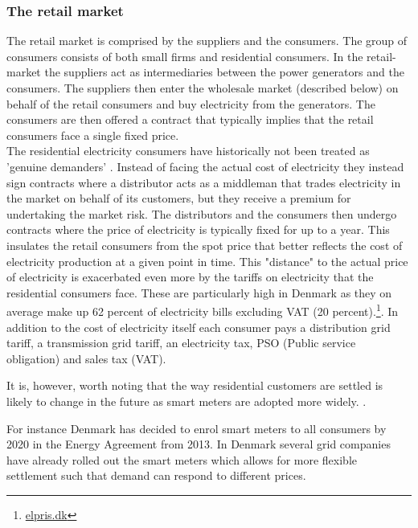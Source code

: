 \subsubsection{The retail market}
\label{subsubsec: t_resmarket}
The retail market is comprised by the suppliers and the consumers. The group of consumers consists of both small firms and residential consumers. In the retail-market the suppliers act as intermediaries between the power generators and the consumers. The suppliers then enter the wholesale market (described below) on behalf of the retail consumers and buy electricity from the generators. The consumers are then offered a contract that typically implies that the retail consumers face a single fixed price. %
\smallskip \\
The residential electricity consumers have historically not been treated as 'genuine demanders' \citep{kirschen2003demand}. Instead of facing the actual cost of electricity they instead sign contracts where a distributor acts as a middleman that trades electricity in the market on behalf of its customers, but they receive a premium for undertaking the market risk. The distributors and the consumers then undergo contracts where the price of electricity is typically fixed for up to a year. This insulates the retail consumers from the spot price that better reflects the cost of electricity production at a given point in time. This "distance" to the actual price of electricity is exacerbated even more by the tariffs on electricity that the residential consumers face. These are particularly high in Denmark as they on average make up 62 percent of electricity bills excluding VAT (20 percent).\footnote{\href{https://elpris.dk}{elpris.dk}}. In addition to the cost of electricity itself each consumer pays a distribution grid tariff, a transmission grid tariff, an electricity tax, PSO (Public service obligation) and sales tax (VAT).
\medskip

It is, however, worth noting that the way residential customers are settled is likely to change in the future as smart meters are adopted more widely. .
\medskip

For instance Denmark has decided to enrol smart meters to all consumers by 2020 in the Energy Agreement from 2013. In Denmark several grid companies have already rolled out the smart meters which allows for more flexible settlement such that demand can respond to different prices. %

